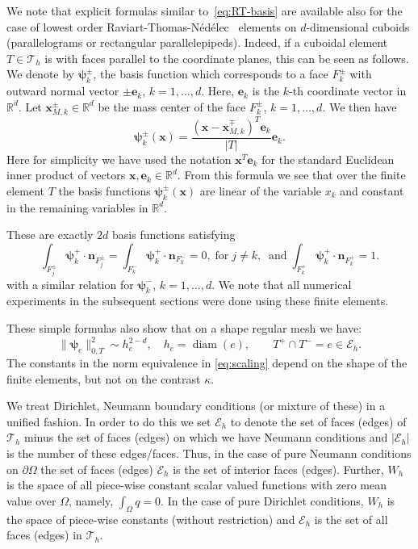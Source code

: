 \documentclass[11pt]{amsart}
\numberwithin{equation}{section}
\theoremstyle{definition}\newtheorem{example}{Example}[section]
\begin{document}
  We note that explicit formulas similar to~\eqref{eq:RT-basis} 
are available also for the case of lowest order 
Raviart-Thomas-{N\'ed\'elec\ } elements on $d$-dimensional cuboids
(parallelograms or rectangular parallelepipeds). Indeed, if a
  cuboidal element $T \in \mathcal{T}_h$ is with faces
  parallel to the coordinate planes, this can be seen as
  follows. We denote by ${{\boldsymbol \psi}}_{k}^{\pm}$, the basis function which
  corresponds to a face $F_k^{\pm}$ with outward normal vector
  $\pm{{\mathbf e}}_k$, $k=1,\ldots,d$. Here, ${{\mathbf e}}_k$ is the $k$-th coordinate
  vector in $\mathbb{R}^d$. Let ${{\mathbf x}}_{M,k}^{\pm} \in \mathbb{R}^d$ be the mass center of
  the face $F_{k}^{\pm}$, $k=1,\ldots,d$. We then have
\begin{equation}\label{eq:RT-basis-cube}
{{\boldsymbol \psi}}_k^{\pm}({{\mathbf x}}) = \frac{({{\mathbf x}}-{{\mathbf x}}_{M,k}^{\mp})^T {{\mathbf e}}_k  }{|T|} {{\mathbf e}}_k .
\end{equation}
Here for simplicity we have used the notation ${{\mathbf x}}^T {{\mathbf e}}_k$ for the standard Euclidean inner 
product of vectors ${{\mathbf x}}, {{\mathbf e}}_k \in \mathbb{R}^d$. From this formula we see that over 
the finite element $T$ the basis functions
$ {{\boldsymbol \psi}}_k^{\pm}({{\mathbf x}})$ are linear of the variable $x_k$ and constant in the
remaining variables in ${\mathbb{R}}^d$. 

These are exactly $2d$ basis functions satisfying
\[
\int_{F_j^{\pm}}{{\boldsymbol \psi}}_k^+\cdot {{\mathbf n}}_{F^\pm_j} = \int_{F_k^{-}}{{\boldsymbol \psi}}_k^+\cdot {{\mathbf n}}_{F^-_k} = 0,
\;\mbox{for}\;  j\neq k,\; 
\;\mbox{and}\; 
\int_{F_k^{+}}{{\boldsymbol \psi}}_k^+\cdot {{\mathbf n}}_{F^+_k} = 1.
\]
with a similar relation for ${{\boldsymbol \psi}}_k^-$, $k=1,\ldots,d$. We note that all numerical experiments in the 
subsequent sections were done using these finite elements.

These
simple formulas also show that on a shape regular mesh we have:
\begin{equation}\label{eq:scaling}
\|{{\boldsymbol \psi}}_e\|_{0,T}^2 \sim h_e^{2-d},\quad h_e=\operatorname{diam}(e),\quad
\quad T^+\cap T^-=e\in \mathcal{E}_h. 
\end{equation}
The constants in the norm equivalence in \eqref{eq:scaling}
depend on the shape of the finite elements, but not on the
contrast $\kappa$.

We treat Dirichlet, Neumann boundary conditions (or mixture of these)
in a unified fashion. In order to do this we set $\mathcal{E}_h$ to
denote the set of faces (edges) of $\mathcal{T}_h$ minus the set of
faces (edges) on which we have Neumann conditions
and $|\mathcal{E}_h|$ is the number of these edges/faces. Thus, in the case of pure
Neumann conditions on $\partial \Omega$ the set of faces (edges) $\mathcal{E}_h$
is the set of interior faces (edges). Further, $W_h$ is the space of all
piece-wise constant scalar valued functions with zero mean value over $\Omega$, namely,
$\int_\Omega q=0$. In the case of pure Dirichlet conditions, $W_h$ is
the space of piece-wise constants (without restriction) and
$\mathcal{E}_h$ is the set of all faces (edges) in $\mathcal{T}_h$.
 
\end{document}
